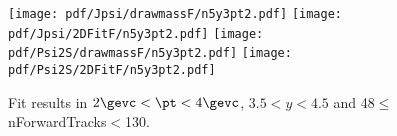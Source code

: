 \begin{figure}[H]
\begin{center}
\texttt{[image: pdf/Jpsi/drawmassF/n5y3pt2.pdf]}
\texttt{[image: pdf/Jpsi/2DFitF/n5y3pt2.pdf]}
\vspace*{-0.5cm}
\texttt{[image: pdf/Psi2S/drawmassF/n5y3pt2.pdf]}
\texttt{[image: pdf/Psi2S/2DFitF/n5y3pt2.pdf]}
\vspace*{-0.5cm}
\end{center}
\caption{Fit results in $2\gevc<\pt<4\gevc$, $3.5<y<4.5$ and 48$\leq$nForwardTracks$<$130.}
\label{Fitn5y3pt2}
\end{figure}
